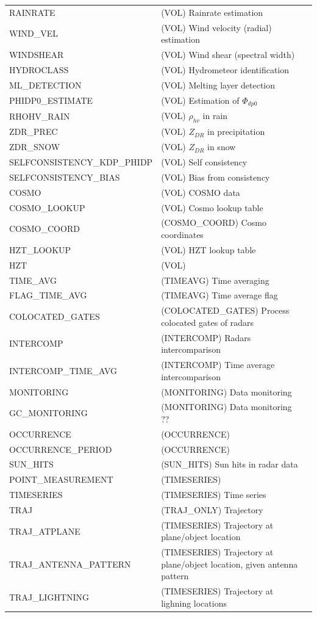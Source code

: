\documentclass[a4paper,11pt,pdftex,twoside]{scrartcl}
\begin{document}
{{{\begin{longtable}{p{}p{}p{}}
RAINRATE & (VOL) Rainrate estimation & \\
WIND\_VEL & (VOL) Wind velocity (radial) estimation & \\
WINDSHEAR & (VOL) Wind shear (spectral width) & \\
HYDROCLASS & (VOL) Hydrometeor identification & \\
ML\_DETECTION &  (VOL) Melting layer detection & \\
PHIDP0\_ESTIMATE &  (VOL) Estimation of $\Phi_{dp0}$ & \\
RHOHV\_RAIN & (VOL) $\rho_{hv}$ in rain & \\
ZDR\_PREC &  (VOL) $Z_{DR}$ in precipitation& \\
ZDR\_SNOW &  (VOL) $Z_{DR}$ in  snow & \\
SELFCONSISTENCY\_KDP\_PHIDP & (VOL) Self consistency & \\
SELFCONSISTENCY\_BIAS & (VOL) Bias from consistency & \\
COSMO & (VOL) COSMO data & \\
COSMO\_LOOKUP & (VOL) Cosmo lookup table & \\
COSMO\_COORD & (COSMO\_COORD) Cosmo coordinates & \\
HZT\_LOOKUP & (VOL) HZT lookup table & \\
HZT  & (VOL) & \\ 
TIME\_AVG & (TIMEAVG) Time averaging & \\
FLAG\_TIME\_AVG & (TIMEAVG) Time average flag& \\
COLOCATED\_GATES & (COLOCATED\_GATES) Process colocated gates of radars & \\
INTERCOMP & (INTERCOMP) Radars intercomparison & \\
INTERCOMP\_TIME\_AVG & (INTERCOMP) Time average intercomparison& \\
MONITORING & (MONITORING) Data monitoring & \\
GC\_MONITORING & (MONITORING) Data monitoring ?? & \\
OCCURRENCE & (OCCURRENCE) & \\
OCCURRENCE\_PERIOD & (OCCURRENCE) & \\
SUN\_HITS & (SUN\_HITS) Sun hits in radar data & \\
POINT\_MEASUREMENT & (TIMESERIES) & \\
TIMESERIES & (TIMESERIES) Time series & \\
TRAJ & (TRAJ\_ONLY) Trajectory & \\
TRAJ\_ATPLANE & (TIMESERIES) Trajectory at plane/object location & \\
TRAJ\_ANTENNA\_PATTERN & (TIMESERIES) Trajectory at plane/object location, given antenna pattern & \\
TRAJ\_LIGHTNING & (TIMESERIES) Trajectory at lighning locations & \\


\end{longtable}}}}
\end{document}
